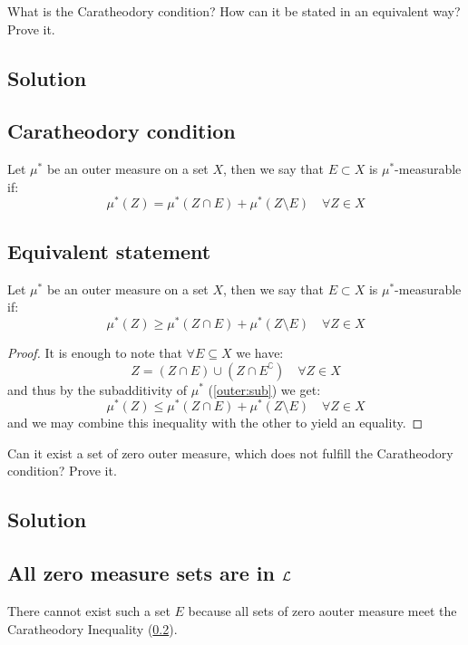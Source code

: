 
\question
What is the Caratheodory condition? How can it be stated in an equivalent way? Prove it.

\subsection*{Solution}

\subsection{Caratheodory condition} \label{CarEq}
Let $\mu^*$ be an outer measure on a set $X$, then we say that $E\subset X$ is $\mu^*$-measurable if:
\[
    \mu^*(Z) = \mu^*(Z\cap E) + \mu^*(Z\setminus E) \quad \forall Z\in X
\]

\subsection{Equivalent statement}\label{CarIneq}
Let $\mu^*$ be an outer measure on a set $X$, then we say that $E\subset X$ is $\mu^*$-measurable if:
\[
    \mu^*(Z) \geq \mu^*(Z\cap E) + \mu^*(Z\setminus E) \quad \forall Z\in X
\]
\begin{proof}
    It is enough to note that $\forall E\subseteq X$ we have:
    \[
        Z = (Z\cap E) \cup (Z \cap E^\complement) \quad \forall Z\in X
    \]
    and thus by the subadditivity of $\mu^*$ (\ref{outer:sub}) we get:
    \[
        \mu^*(Z) \leq \mu^*(Z\cap E) + \mu^*(Z\setminus E) \quad \forall Z\in X
    \]
    and we may combine this inequality with the other to yield an equality.
\end{proof}


\question
Can it exist a set of zero outer measure, which does not fulfill the Caratheodory condition? Prove it.

\subsection*{Solution}

\subsection{All zero measure sets are in \texorpdfstring{$\mathcal{L}$}{L}} \label{zerosetsaremeas}
There cannot exist such a set $E$ because all sets of zero aouter measure meet the Caratheodory Inequality (\ref{CarIneq}).

